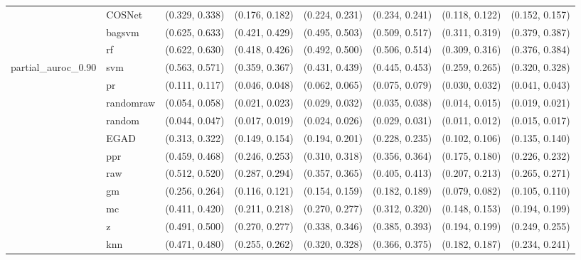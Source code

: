 \begin{table}[H]
{\begin{tabular}{llllllll}
 & COSNet & (0.329, 0.338) & (0.176, 0.182) & (0.224, 0.231) & (0.234, 0.241) & (0.118, 0.122) & (0.152, 0.157)\\

 & bagsvm & (0.625, 0.633) & (0.421, 0.429) & (0.495, 0.503) & (0.509, 0.517) & (0.311, 0.319) & (0.379, 0.387)\\

 & rf & (0.622, 0.630) & (0.418, 0.426) & (0.492, 0.500) & (0.506, 0.514) & (0.309, 0.316) & (0.376, 0.384)\\

\multirow{-15}{*}{\raggedright\arraybackslash partial\_auroc\_0.90} & svm & (0.563, 0.571) & (0.359, 0.367) & (0.431, 0.439) & (0.445, 0.453) & (0.259, 0.265) & (0.320, 0.328)\\
\cmidrule{1-8}
 & pr & (0.111, 0.117) & (0.046, 0.048) & (0.062, 0.065) & (0.075, 0.079) & (0.030, 0.032) & (0.041, 0.043)\\

 & randomraw & (0.054, 0.058) & (0.021, 0.023) & (0.029, 0.032) & (0.035, 0.038) & (0.014, 0.015) & (0.019, 0.021)\\

 & random & (0.044, 0.047) & (0.017, 0.019) & (0.024, 0.026) & (0.029, 0.031) & (0.011, 0.012) & (0.015, 0.017)\\

 & EGAD & (0.313, 0.322) & (0.149, 0.154) & (0.194, 0.201) & (0.228, 0.235) & (0.102, 0.106) & (0.135, 0.140)\\

 & ppr & (0.459, 0.468) & (0.246, 0.253) & (0.310, 0.318) & (0.356, 0.364) & (0.175, 0.180) & (0.226, 0.232)\\

 & raw & (0.512, 0.520) & (0.287, 0.294) & (0.357, 0.365) & (0.405, 0.413) & (0.207, 0.213) & (0.265, 0.271)\\

 & gm & (0.256, 0.264) & (0.116, 0.121) & (0.154, 0.159) & (0.182, 0.189) & (0.079, 0.082) & (0.105, 0.110)\\

 & mc & (0.411, 0.420) & (0.211, 0.218) & (0.270, 0.277) & (0.312, 0.320) & (0.148, 0.153) & (0.194, 0.199)\\

 & z & (0.491, 0.500) & (0.270, 0.277) & (0.338, 0.346) & (0.385, 0.393) & (0.194, 0.199) & (0.249, 0.255)\\

 & knn & (0.471, 0.480) & (0.255, 0.262) & (0.320, 0.328) & (0.366, 0.375) & (0.182, 0.187) & (0.234, 0.241)\\


\end{tabular}}
\end{table}
